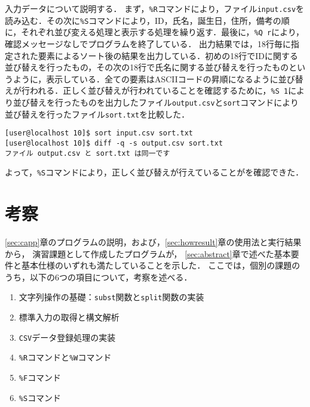 入力データについて説明する．
まず，\verb|%R|コマンドにより，ファイル\verb|input.csv|を読み込む．その次に\verb|%S|コマンドにより，ID，氏名，誕生日，住所，備考の順に，それぞれ並び変える処理と表示する処理を繰り返す．最後に，\verb|%Q r|により，確認メッセージなしでプログラムを終了している．
出力結果では，18行毎に指定された要素によるソート後の結果を出力している．初めの18行でIDに関する並び替えを行ったもの，その次の18行で氏名に関する並び替えを行ったものというように，表示している．全ての要素はASCIIコードの昇順になるように並び替えが行われる．正しく並び替えが行われていることを確認するために，\verb|%S 1|により並び替えを行ったものを出力したファイル\verb|output.csv|と\verb|sort|コマンドにより並び替えを行ったファイル\verb|sort.txt|を比較した．

{\fontsize{10pt}{11pt} \selectfont
 \begin{verbatim}
[user@localhost 10]$ sort input.csv sort.txt
[user@localhost 10]$ diff -q -s output.csv sort.txt
ファイル output.csv と sort.txt は同一です
 \end{verbatim}
}

よって，\verb|%S|コマンドにより，正しく並び替えが行えていることがを確認できた．

\section{考察}

\ref{sec:capp}章のプログラムの説明，および，\ref{sec:howresult}章の使用法と実行結果から，
演習課題として作成したプログラムが，
\ref{sec:abstract}章で述べた基本要件と基本仕様のいずれも満たしていることを示した．
ここでは，個別の課題のうち，以下の6つの項目について，考察を述べる．

\begin{enumerate}
\setlength{\parskip}{2pt} \setlength{\itemsep}{2pt}
    \item 文字列操作の基礎：\texttt{subst}関数と\texttt{split}関数の実装
    \item 標準入力の取得と構文解析
    \item \texttt{CSV}データ登録処理の実装
    \item \texttt{\%R}コマンドと\texttt{\%W}コマンド
    \item \texttt{\%F}コマンド
    \item \texttt{\%S}コマンド
\end{enumerate}

